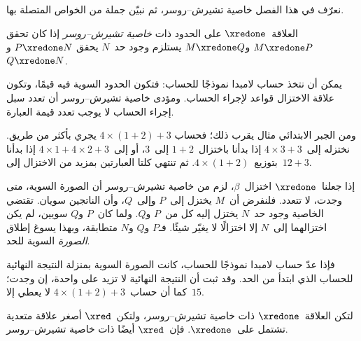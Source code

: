 \documentclass[../../../include/open-logic-section]{subfiles}
\begin{document}


نعرّف في هذا الفصل خاصية تشيرش--روسر، ثم نبيّن جملة من الخواص المتصلة بها.

\begin{defn} العلاقة~$\xredone$ على الحدود
  ذات \emph{خاصية تشيرش--روسر} إذا كان تحقق
  $M \xredone P$ و$M \xredone Q$ يستلزم وجود حد~$N$ يحقق
  $P \xredone N$ و$Q \xredone N$.
\end{defn}

يمكن أن نتخذ حساب لامبدا نموذجًا للحساب: فتكون الحدود السوية فيه قيمًا،
وتكون علاقة الاختزال قواعد لإجراء الحساب.
ومؤدى خاصية تشيرش--روسر أن تعدد سبل إجراء الحساب لا يوجب تعدد قيمة العبارة.

ومن الجبر الابتدائي مثال يقرب ذلك؛ فحساب
$4 \times (1+2) + 3$ يجري بأكثر من طريق.
نختزله إلى~$4 \times 3+3$ إذا بدأنا باختزال~$1+2$ إلى~$3$،
أو إلى~$4 \times 1+4 \times 2+3$ إذا بدأنا بتوزيع~$4 \times (1+2)$.
ثم تنتهي كلتا العبارتين بمزيد من الاختزال إلى~$12+3$.

إذا جعلنا~$\xredone$ اختزال~$\beta$، لزم من خاصية تشيرش--روسر أن الصورة السوية،
متى وجدت، لا تتعدد. فلنفرض أن~$M$ يختزل إلى~$P$ وإلى~$Q$،
وأن الناتجين سويان. تقتضي الخاصية وجود حد~$N$ يختزل إليه كل من~$P$ و$Q$.
ولما كان~$P$ و$Q$ سويين، لم يكن اختزالهما إلى~$N$ إلا اختزالًا لا يغيّر شيئًا.
فـ$P$ و$Q$ و$N$ متطابقة، وبهذا يسوغ إطلاق \emph{الصورة} السوية للحد.

فإذا عدّ حساب لامبدا نموذجًا للحساب، كانت الصورة السوية بمنزلة النتيجة النهائية
للحساب الذي ابتدأ من الحد. وقد ثبت أن النتيجة النهائية لا تزيد على واحدة،
إن وجدت؛ كما أن حساب~$4 \times (1+2)+3$ لا يعطي إلا~$15$.

\begin{thm} 
  لتكن العلاقة~$\xredone$ ذات خاصية تشيرش--روسر، ولتكن~$\xred$ أصغر علاقة متعدية
  تشتمل على~$\xredone$. فإن~$\xred$ أيضًا ذات خاصية تشيرش--روسر.
\end{thm}
\end{document}

